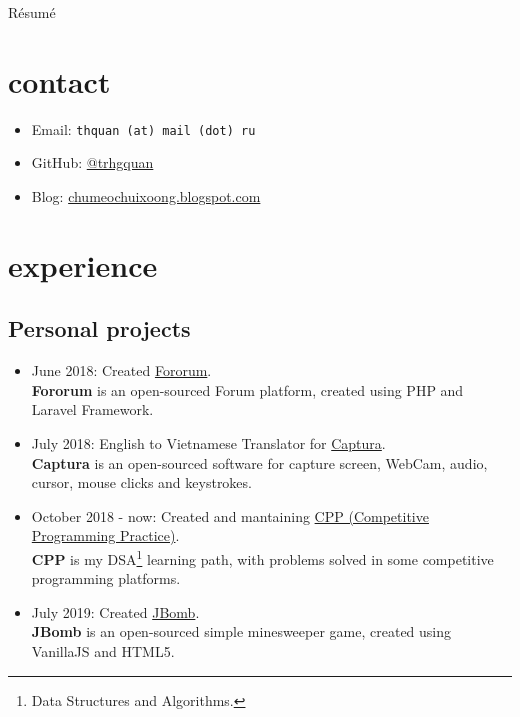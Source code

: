 \documentclass{article}
\renewcommand{\maketitle}{
\begin{center}
{\huge\bfseries\theauthor}
\linebreak\linebreak
R\'esum\'e
\end{center}
}
\begin{document}
\author{Quan, Tran Hoang}
\maketitle

\section{contact}
\begin{itemize}
\item Email: \texttt{thquan (at) mail (dot) ru}
\item GitHub: \href{https://github.com/trhgquan}{@trhgquan}
\item Blog: \href{https://chumeochuixoong.blogspot.com}{chumeochuixoong.blogspot.com}
\end{itemize}

\section{experience}
\subsection{Personal projects}
\begin{itemize}
\item June 2018: Created \href{https://github.com/trhgquan/Fororum}{Fororum}.\\
\textbf{Fororum} is an open-sourced Forum platform, created using PHP and Laravel Framework.

\item July 2018: English to Vietnamese Translator for \href{https://github.com/MathewSachin/Captura}{Captura}.\\
\textbf{Captura} is an open-sourced software for capture screen, WebCam, audio, cursor, mouse clicks and keystrokes.

\item October 2018 - now: Created and mantaining \href{https://github.com/trhgquan/CPP}{CPP (Competitive Programming Practice)}.\\
\textbf{CPP} is my DSA\footnote{Data Structures and Algorithms.} learning path, with problems solved in some competitive programming platforms.

\item July 2019: Created \href{https://github.com/trhgquan/JBomb}{JBomb}.\\
\textbf{JBomb} is an open-sourced simple minesweeper game, created using VanillaJS and HTML5.
\end{itemize}
\end{document}
